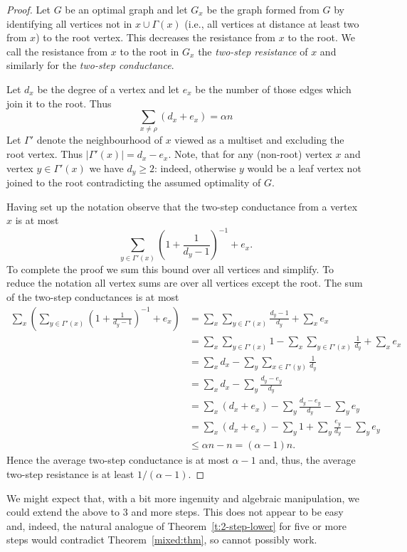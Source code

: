\documentclass[11pt]{article}
\theoremstyle{remark}
\def\a{\alpha}
\begin{document}
\begin{proof}Let $G$ be an optimal graph and let $G_x$ be the graph
  formed from $G$ by identifying all vertices not in $x\cup \Gamma(x)$
  (i.e., all vertices at distance at least two from $x$) to the root
  vertex. This decreases the resistance from $x$ to the root. We call
  the resistance from $x$ to the root in $G_x$ the \emph{two-step
    resistance} of $x$ and similarly for the \emph{two-step
    conductance}.

  Let $d_x$ be the degree of a vertex and let $e_x$ be the number of
  those edges which join it to the root. Thus
  \[
  \sum_{x\not=\rho}(d_x+e_x)=\alpha n
  \]
  Let $\Gamma'$ denote the neighbourhood of $x$ viewed as a
  multiset and excluding the root vertex. Thus
  $|\Gamma'(x)|=d_x-e_x$. Note, that for any (non-root) vertex $x$ and
  vertex $y\in\Gamma'(x)$ we have $d_y\geq2$: indeed, otherwise $y$
  would be a leaf vertex not joined to the root contradicting the
  assumed optimality of $G$.

  Having set up the notation observe that the two-step conductance
  from a vertex $x$ is at most
  \[
  \sum_{y\in\Gamma'(x)}\left(1+\frac1{d_y-1}\right)^{-1}+e_x.
  \]
  To complete the proof we sum this bound over all vertices and
  simplify.  To reduce the notation all vertex sums are over all vertices
  except the root.  The sum of the two-step conductances is at
  most
\begin{align*}
  \sum_x\left(\sum_{y\in\Gamma'(x)}\left(1+\frac1{d_y-1}\right)^{-1}+e_x\right)
  &=\sum_x\sum_{y\in\Gamma'(x)}\frac{d_y-1}{d_y}+\sum_x e_x\nonumber\\
  &=\sum_x\sum_{y\in\Gamma'(x)}1-\sum_x\sum_{y\in\Gamma'(x)}\frac{1}{d_y}+\sum_x e_x\nonumber\\
  &=\sum_xd_x-\sum_y\sum_{x\in\Gamma'(y)}\frac{1}{d_y}\nonumber\\
  &=\sum_xd_x-\sum_y \frac{d_y-e_y}{d_y}\nonumber\\
  &=\sum_x(d_x+e_x)-\sum_y \frac{d_y-e_y}{d_y}-\sum_ye_y\nonumber\\
  &=\sum_x(d_x+e_x)-\sum_y1 + \sum_y \frac{e_y}{d_y}-\sum_ye_y\label{e:two-stage-line}\\
  &\le\alpha n-n=(\alpha-1)n.\nonumber
\end{align*}
Hence the average two-step conductance is at most $\alpha-1$ and,
thus, the average two-step resistance is at least $1/(\a-1)$.
\end{proof}
We might expect that, with a bit more ingenuity and algebraic
manipulation, we could extend the above to 3 and more steps. This does
not appear to be easy and, indeed, the natural analogue of
Theorem~\ref{t:2-step-lower} for five or more steps would contradict
Theorem~\ref{mixed:thm}, so cannot possibly work.
\end{document}
